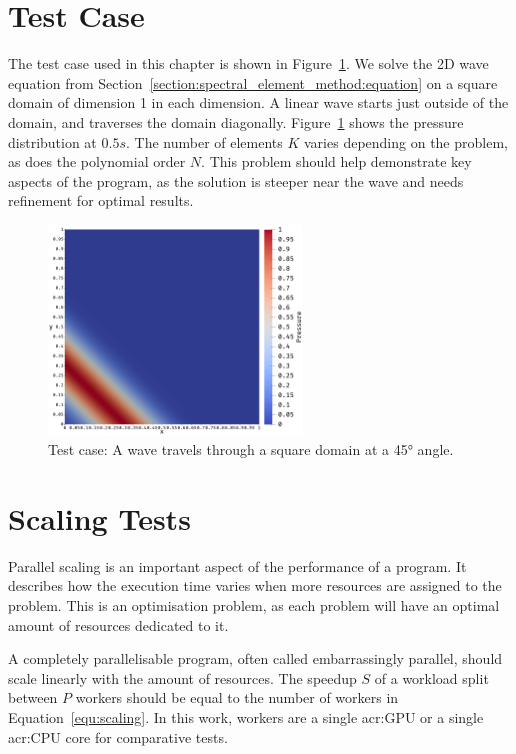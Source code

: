 \section{Test Case}\label{section:results:test_case}

The test case used in this chapter is shown in Figure~\ref{fig:problem}. We solve the 2D wave
equation from Section~\ref{section:spectral_element_method:equation} on a square domain of dimension
1 in each dimension. A linear wave starts just outside of the domain, and traverses the domain
diagonally. Figure~\ref{fig:problem} shows the pressure distribution at \(0.5 s\). The number of
elements \( K \) varies depending on the problem, as does the polynomial order \( N \). This problem
should help demonstrate key aspects of the program, as the solution is steeper near the wave and
needs refinement for optimal results.

\begin{figure}[H]
	\centering
	\includegraphics[width=0.6\textwidth]{Chapter_results/media/problem_1}
	\caption{Test case: A wave travels through a square domain at a 45° angle.}\label{fig:problem}
\end{figure}

\section{Scaling Tests}\label{section:results:scaling_tests}

Parallel scaling is an important aspect of the performance of a program. It describes how the
execution time varies when more resources are assigned to the problem. This is an optimisation
problem, as each problem will have an optimal amount of resources dedicated to it. 

A completely parallelisable program, often called embarrassingly parallel, should scale linearly
with the amount of resources. The speedup \(S\) of a workload split between \(P\) workers should be
equal to the number of workers in Equation~\ref{equ:scaling}. In this work, workers are a single
\acrshort{acr:GPU} or a single \acrshort{acr:CPU} core for comparative tests.

